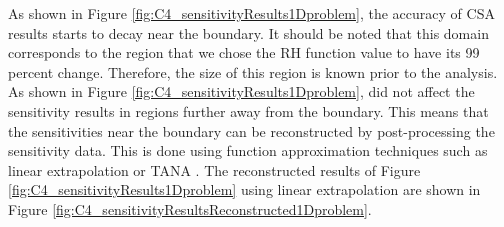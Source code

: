 As shown in Figure \ref{fig:C4_sensitivityResults1Dproblem}, the accuracy of CSA results starts to decay near the boundary. It should be noted that this domain corresponds to the region that we chose the RH function value to have its 99 percent change. Therefore, the size of this region is known prior to the analysis. As shown in Figure \ref{fig:C4_sensitivityResults1Dproblem}, did not affect the sensitivity results in regions further away from the boundary. This means that the sensitivities near the boundary can be reconstructed by post-processing the sensitivity data. This is done using function approximation techniques such as linear extrapolation or TANA \cite{wang1995improved}. The reconstructed results of Figure \ref{fig:C4_sensitivityResults1Dproblem} using linear extrapolation are shown in Figure \ref{fig:C4_sensitivityResultsReconstructed1Dproblem}.

